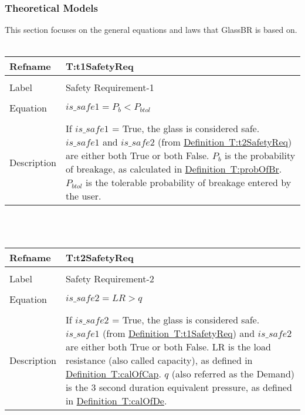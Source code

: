 \documentclass[12pt]{article}
\begin{document}
\subsubsection{Theoretical Models}
\label{Sec:TheoMode}
This section focuses on the general equations and laws that GlassBR is based on.
~\newline
\noindent \begin{minipage}{\textwidth}
\begin{tabular}{p{} p{}}
\toprule \textbf{Refname} & \textbf{T:t1SafetyReq}
\label{T:t1SafetyReq}
\\ \midrule \\
Label & Safety Requirement-1
\\ \midrule \\
Equation & $is\_safe1=P_{b}<P_{btol}$
\\ \midrule \\
Description & If $is\_safe1$ = True, the glass is considered safe. $is\_safe1$ and $is\_safe2$ (from \hyperref[T:t2SafetyReq]{Definition~T:t2SafetyReq}) are either both True or both False. $P_{b}$ is the probability of breakage, as calculated in \hyperref[T:probOfBr]{Definition~T:probOfBr}. $P_{btol}$ is the tolerable probability of breakage entered by the user.
\\ \bottomrule \end{tabular}
\end{minipage}\\
~\newline
\noindent \begin{minipage}{\textwidth}
\begin{tabular}{p{} p{}}
\toprule \textbf{Refname} & \textbf{T:t2SafetyReq}
\label{T:t2SafetyReq}
\\ \midrule \\
Label & Safety Requirement-2
\\ \midrule \\
Equation & $is\_safe2=LR>q$
\\ \midrule \\
Description & If $is\_safe2$ = True, the glass is considered safe. $is\_safe1$ (from \hyperref[T:t1SafetyReq]{Definition~T:t1SafetyReq}) and $is\_safe2$ are either both True or both False. LR is the load resistance (also called capacity), as defined in \hyperref[T:calOfCap]{Definition~T:calOfCap}. $q$ (also referred as the Demand) is the 3 second duration equivalent pressure, as defined in \hyperref[T:calOfDe]{Definition~T:calOfDe}.
\\ \bottomrule \end{tabular}
\end{minipage}\\
\end{document}
